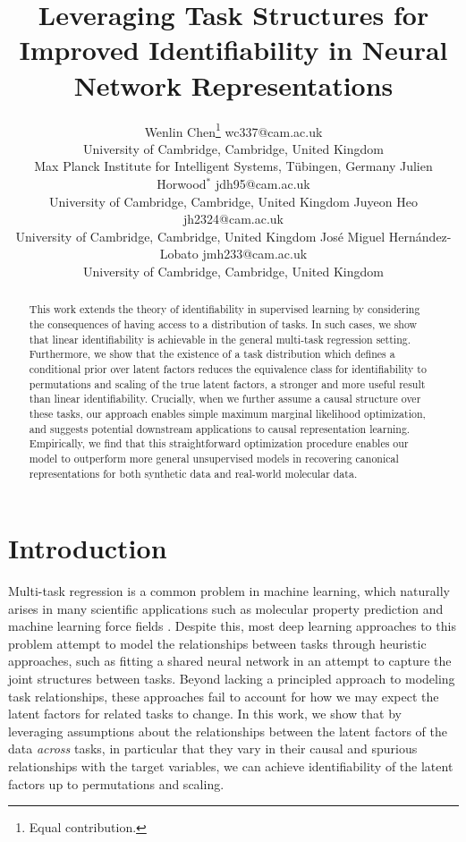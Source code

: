\documentclass[10pt]{article} %
\title{Leveraging Task Structures for Improved Identifiability in Neural Network Representations}
\author{\name Wenlin Chen\thanks{Equal contribution.} \email wc337@cam.ac.uk \\
      \addr University of Cambridge, Cambridge, United Kingdom \\
      Max Planck Institute for Intelligent Systems, Tübingen, Germany
      \AND
      \name Julien Horwood$^*$ \email jdh95@cam.ac.uk \\
      \addr University of Cambridge, Cambridge, United Kingdom
      \AND
      \name Juyeon Heo \email jh2324@cam.ac.uk\\
      \addr  University of Cambridge, Cambridge, United Kingdom
      \AND
      \name José Miguel Hernández-Lobato \email jmh233@cam.ac.uk\\
      \addr  University of Cambridge, Cambridge, United Kingdom}
\theoremstyle{plain}
\theoremstyle{definition}
\begin{document}
\maketitle

\begin{abstract}
This work extends the theory of identifiability in supervised learning by considering the consequences of having access to a distribution of tasks.
In such cases, we show that linear identifiability is achievable in the general multi-task regression setting.
Furthermore, we show that the existence of a task distribution which defines a conditional prior over latent factors reduces the equivalence class for identifiability to permutations and scaling of the true latent factors, a stronger and more useful result than linear identifiability. Crucially, when we further assume a causal structure over these tasks, our approach enables simple maximum marginal likelihood optimization, and suggests potential downstream applications to causal representation learning. Empirically, we find that this straightforward optimization procedure enables our model to outperform more general unsupervised models in recovering canonical representations for both synthetic data and real-world molecular data.
\end{abstract}

\section{Introduction}

Multi-task regression is a common problem in machine learning, which naturally arises in many scientific applications such as molecular property prediction \citep{stanley2021fsmol,chen2023metalearning} and machine learning force fields \citep{jacobson2023leveraging}. Despite this, most deep learning approaches to
this problem attempt to model the relationships between tasks through heuristic approaches, such as fitting a shared neural network in an attempt to capture the joint structures between tasks.
Beyond lacking a principled approach to modeling task relationships, these approaches fail to account for how we may expect the latent factors for related tasks to change. In this work, we show that by leveraging assumptions about the relationships between the latent factors of the data \textit{across} tasks, in particular that they vary in their causal and spurious relationships with the target variables, we can achieve identifiability of the latent factors up to permutations and scaling. 
\end{document}
